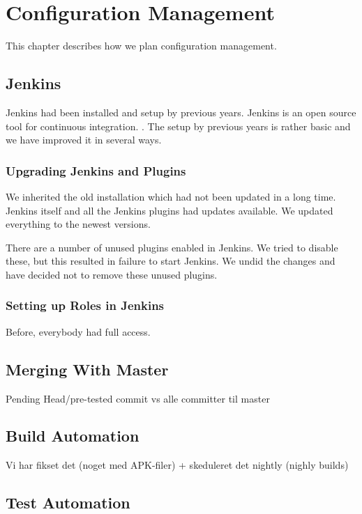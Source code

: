 \chapter{Configuration Management}%
This chapter describes how we plan configuration management.

\section{Jenkins}
Jenkins had been installed and setup by previous years. Jenkins is an open source tool for continuous integration. . The setup by previous years is rather basic and we have improved it in several ways.

\subsection{Upgrading Jenkins and Plugins}
We inherited the old installation which had not been updated in a long time. Jenkins itself and all the Jenkins plugins had updates available. We updated everything to the newest versions.

There are a number of unused plugins enabled in Jenkins. We tried to disable these, but this resulted in failure to start Jenkins. We undid the changes and have decided not to remove these unused plugins. 

\subsection{Setting up Roles in Jenkins}
Before, everybody had full access.

\section{Merging With Master}
Pending Head/pre-tested commit vs alle committer til master

\section{Build Automation}
Vi har fikset det (noget med APK-filer) + skeduleret det nightly (nighly builds)

\section{Test Automation}
